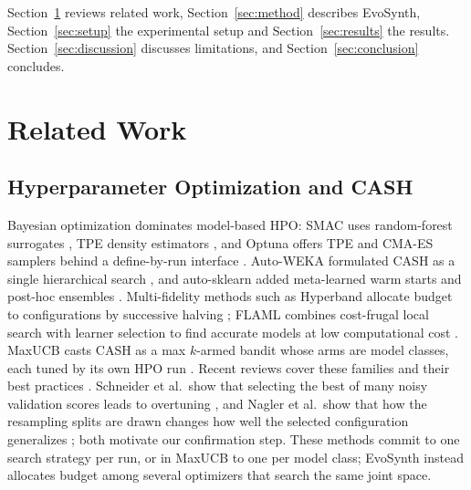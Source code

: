 \documentclass[conference]{IEEEtran}
\begin{document}
Section~\ref{sec:related} reviews related work, Section~\ref{sec:method} describes EvoSynth, Section~\ref{sec:setup} the experimental setup and Section~\ref{sec:results} the results. Section~\ref{sec:discussion} discusses limitations, and Section~\ref{sec:conclusion} concludes.

\section{Related Work}\label{sec:related}

\subsection{Hyperparameter Optimization and CASH}
Bayesian optimization dominates model-based HPO: SMAC uses random-forest surrogates \cite{hutter2011sequential}, TPE density estimators \cite{bergstra2011algorithms}, and Optuna offers TPE and CMA-ES samplers behind a define-by-run interface \cite{akiba2019optuna}. Auto-WEKA formulated CASH as a single hierarchical search \cite{thornton2013autoweka}, and auto-sklearn added meta-learned warm starts and post-hoc ensembles \cite{feurer2015efficient}. Multi-fidelity methods such as Hyperband allocate budget to configurations by successive halving \cite{li2018hyperband}; FLAML combines cost-frugal local search with learner selection to find accurate models at low computational cost \cite{wang2021flaml}. MaxUCB casts CASH as a max $k$-armed bandit whose arms are model classes, each tuned by its own HPO run \cite{balef2025cash}. Recent reviews cover these families and their best practices \cite{bischl2023hyperparameter, franceschi2025hyperparameter, alcobaca2026literature}. Schneider et al.\ show that selecting the best of many noisy validation scores leads to overtuning \cite{schneider2025overtuning}, and Nagler et al.\ show that how the resampling splits are drawn changes how well the selected configuration generalizes \cite{nagler2024reshuffling}; both motivate our confirmation step. These methods commit to one search strategy per run, or in MaxUCB to one per model class; EvoSynth instead allocates budget among several optimizers that search the same joint space.
\end{document}
